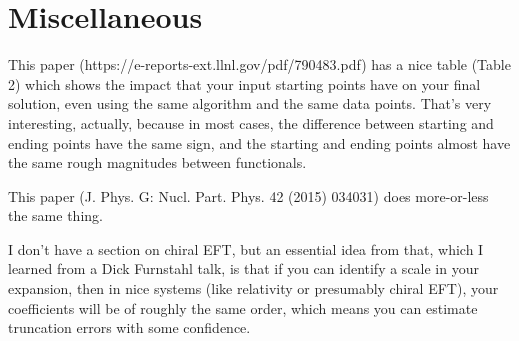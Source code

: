 \section{Miscellaneous}

This paper (https://e-reports-ext.llnl.gov/pdf/790483.pdf) has a nice table (Table 2) which shows the impact that your input starting points have on your final solution, even using the same algorithm and the same data points. That's very interesting, actually, because in most cases, the difference between starting and ending points have the same sign, and the starting and ending points almost have the same rough magnitudes between functionals.

This paper (J. Phys. G: Nucl. Part. Phys. 42 (2015) 034031) does more-or-less the same thing.

I don't have a section on chiral EFT, but an essential idea from that, which I learned from a Dick Furnstahl talk, is that if you can identify a scale in your expansion, then in nice systems (like relativity or presumably chiral EFT), your coefficients will be of roughly the same order, which means you can estimate truncation errors with some confidence.
